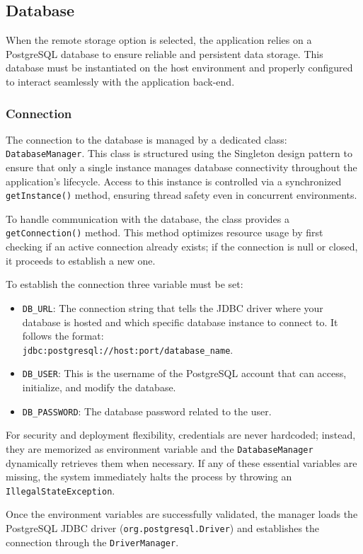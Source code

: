 \subsection{Database}
When the remote storage option is selected, the application relies on a PostgreSQL database to ensure reliable and persistent data storage. This database must be instantiated on the host environment and properly configured to interact seamlessly with the application back-end.

\subsubsection{Connection}
The connection to the database is managed by a dedicated class: \texttt{DatabaseManager}. This class is structured using the Singleton design pattern to ensure that only a single instance manages database connectivity throughout the application's lifecycle. Access to this instance is controlled via a synchronized \texttt{getInstance()} method, ensuring thread safety even in concurrent environments.

To handle communication with the database, the class provides a \texttt{getConnection()} method. This method optimizes resource usage by first checking if an active connection already exists; if the connection is null or closed, it proceeds to establish a new one.
 
To establish the connection three variable must be set: 
\begin{itemize}
	\item \texttt{DB\_URL}: The connection string that tells the JDBC driver where your database is hosted and which specific database instance to connect to. It follows the format:\\ \texttt{jdbc:postgresql://host:port/database\_name}.
	\item \texttt{DB\_USER}: This is the username of the PostgreSQL account that can access, initialize, and modify the database.
	\item \texttt{DB\_PASSWORD}: The database password related to the user.
\end{itemize}
For security and deployment flexibility, credentials are never hardcoded; instead, they are memorized as environment variable and the \texttt{DatabaseManager} dynamically retrieves them when necessary. If any of these essential variables are missing, the system immediately halts the process by throwing an \texttt{IllegalStateException}. 

Once the environment variables are successfully validated, the manager loads the PostgreSQL JDBC driver (\texttt{org.postgresql.Driver}) and establishes the connection through the \texttt{DriverManager}.


